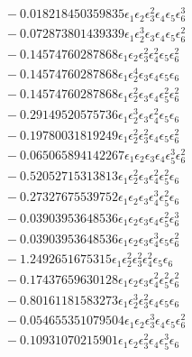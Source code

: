 \documentclass[10pt]{article}
\begin{document}
\begin{align*}
&{}  - 0.018218450359835 \epsilon_{1} \epsilon_{2} \epsilon_{3}^{2} \epsilon_{4} \epsilon_{5} \epsilon_{6}^{3} \\
&{}  - 0.072873801439339 \epsilon_{1} \epsilon_{2}^{3} \epsilon_{3} \epsilon_{4} \epsilon_{5} \epsilon_{6}^{2} \\
&{}  - 0.14574760287868 \epsilon_{1} \epsilon_{2} \epsilon_{3}^{2} \epsilon_{4}^{2} \epsilon_{5} \epsilon_{6}^{2} \\
&{}  - 0.14574760287868 \epsilon_{1} \epsilon_{2}^{4} \epsilon_{3} \epsilon_{4} \epsilon_{5} \epsilon_{6} \\
&{}  - 0.14574760287868 \epsilon_{1} \epsilon_{2}^{2} \epsilon_{3} \epsilon_{4} \epsilon_{5}^{2} \epsilon_{6}^{2} \\
&{}  - 0.29149520575736 \epsilon_{1} \epsilon_{2}^{3} \epsilon_{3} \epsilon_{4}^{2} \epsilon_{5} \epsilon_{6} \\
&{}  - 0.19780031819249 \epsilon_{1} \epsilon_{2}^{2} \epsilon_{3}^{2} \epsilon_{4} \epsilon_{5} \epsilon_{6}^{2} \\
&{}  - 0.065065894142267 \epsilon_{1} \epsilon_{2} \epsilon_{3} \epsilon_{4} \epsilon_{5}^{3} \epsilon_{6}^{2} \\
&{}  - 0.52052715313813 \epsilon_{1} \epsilon_{2}^{2} \epsilon_{3} \epsilon_{4}^{2} \epsilon_{5}^{2} \epsilon_{6} \\
&{}  - 0.27327675539752 \epsilon_{1} \epsilon_{2} \epsilon_{3} \epsilon_{4}^{3} \epsilon_{5}^{2} \epsilon_{6} \\
&{}  - 0.03903953648536 \epsilon_{1} \epsilon_{2} \epsilon_{3} \epsilon_{4} \epsilon_{5}^{2} \epsilon_{6}^{3} \\
&{}  - 0.03903953648536 \epsilon_{1} \epsilon_{2} \epsilon_{3} \epsilon_{4}^{3} \epsilon_{5} \epsilon_{6}^{2} \\
&{}  - 1.2492651675315 \epsilon_{1} \epsilon_{2}^{2} \epsilon_{3}^{2} \epsilon_{4}^{2} \epsilon_{5} \epsilon_{6} \\
&{}  - 0.17437659630128 \epsilon_{1} \epsilon_{2} \epsilon_{3} \epsilon_{4}^{2} \epsilon_{5}^{2} \epsilon_{6}^{2} \\
&{}  - 0.80161181583273 \epsilon_{1} \epsilon_{2}^{3} \epsilon_{3}^{2} \epsilon_{4} \epsilon_{5} \epsilon_{6} \\
&{}  - 0.054655351079504 \epsilon_{1} \epsilon_{2} \epsilon_{3}^{3} \epsilon_{4} \epsilon_{5} \epsilon_{6}^{2} \\
&{}  - 0.10931070215901 \epsilon_{1} \epsilon_{2} \epsilon_{3}^{2} \epsilon_{4} \epsilon_{5}^{3} \epsilon_{6} \\

\end{align*}
\end{document}
